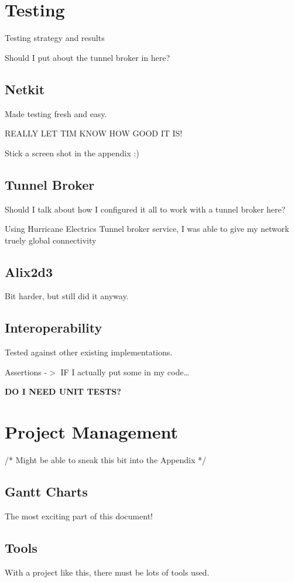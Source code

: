\documentclass[12pt]{report}
\begin{document}
\chapter{Testing}
Testing strategy and results

Should I put about the tunnel broker in here?

\section{Netkit} 
Made testing fresh and easy. 

REALLY LET TIM KNOW HOW GOOD IT IS!

Stick a screen shot in the appendix :)

\section{Tunnel Broker}
Should I talk about how I configured it all to work with a tunnel broker here?

Using Hurricane Electrics Tunnel broker service, I was able to give my network
truely global connectivity

\section{Alix2d3}
Bit harder, but still did it anyway.

\section{Interoperability}

Tested against other existing implementations.

Assertions -$>$ IF I actually put some in my code\ldots

\textbf{DO I NEED UNIT TESTS?}

\chapter{Project Management}
/* Might be able to sneak this bit into the Appendix */

\section{Gantt Charts}
The most exciting part of this document!

\section{Tools}
With a project like this, there must be lots of tools used. 
\end{document}
